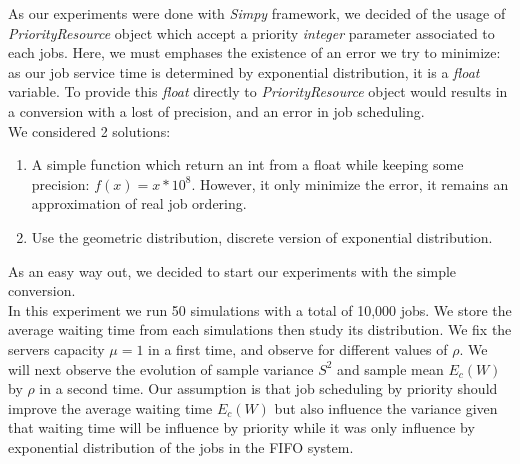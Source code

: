 \documentclass{article}
\begin{document}
    As our experiments were done with \emph{Simpy} framework, we decided of the usage of \emph{PriorityResource} object which accept a priority \emph{integer} parameter associated to each jobs.
    Here, we must emphases the existence of an error we try to minimize: as our job service time is determined by exponential distribution, it is a \emph{float} variable. To provide this \emph{float} directly to \emph{PriorityResource} object would results in a conversion with a lost of precision, and an error in job scheduling.\\
    We considered 2 solutions:
    \begin{enumerate}
        \item A simple function which return an int from a float while keeping some precision: $f(x) = x * 10^8$. However, it only minimize the error, it remains an approximation of real job ordering.
        \item Use the geometric distribution, discrete version of exponential distribution.
    \end{enumerate}
    As an easy way out, we decided to start our experiments with the simple conversion.\\

    In this experiment we run 50 simulations with a total of 10,000 jobs. We store the average waiting time from each simulations then study its distribution. We fix the servers capacity $\mu = 1$ in a first time, and observe for different values of $\rho$. We will next observe the evolution of sample variance $S^2$ and sample mean $E_c(W)$ by $\rho$ in a second time.
    Our assumption is that job scheduling by priority should improve the average waiting time $E_c(W)$ but also influence the variance given that waiting time will be influence by priority while it was only influence by exponential distribution of the jobs in the FIFO system.
\end{document}
